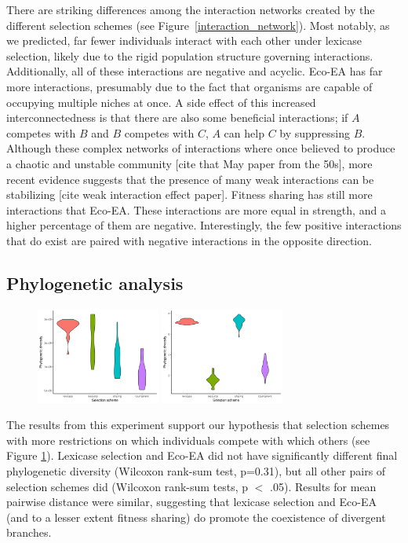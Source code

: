 There are striking differences among the interaction networks created by the different selection schemes (see Figure~\ref{interaction_network}). Most notably, as we predicted, far fewer individuals interact with each other under lexicase selection, likely due to the rigid population structure governing interactions. Additionally, all of these interactions are negative and acyclic. Eco-EA has far more interactions, presumably due to the fact that organisms are capable of occupying multiple niches at once. A side effect of this increased interconnectedness is that there are also some beneficial interactions; if $A$ competes with $B$ and $B$ competes with $C$, $A$ can help $C$ by suppressing $B$. Although these complex networks of interactions where once believed to produce a chaotic and unstable community [cite that May paper from the 50s], more recent evidence suggests that the presence of many weak interactions can be stabilizing [cite weak interaction effect paper]. Fitness sharing has still more interactions that Eco-EA. These interactions are more equal in strength, and a higher percentage of them are negative. Interestingly, the few positive interactions that do exist are paired with negative interactions in the opposite direction. 


\subsection{Phylogenetic analysis}

\begin{figure}
\includegraphics[width=1.6in]{figs/phylo_all.png}
\includegraphics[width=1.6in]{figs/pheno_all.png}
\caption{}
\label{phylo_results}
\end{figure}

The results from this experiment support our hypothesis that selection schemes with more restrictions on which individuals compete with which others (see Figure \ref{phylo_results}). Lexicase selection and Eco-EA did not have significantly different final phylogenetic diversity (Wilcoxon rank-sum test, p=0.31), but all other pairs of selection schemes did (Wilcoxon rank-sum tests, p $<$ .05). Results for mean pairwise distance were similar, suggesting that lexicase selection and Eco-EA (and to a lesser extent fitness sharing) do promote the coexistence of divergent branches.

